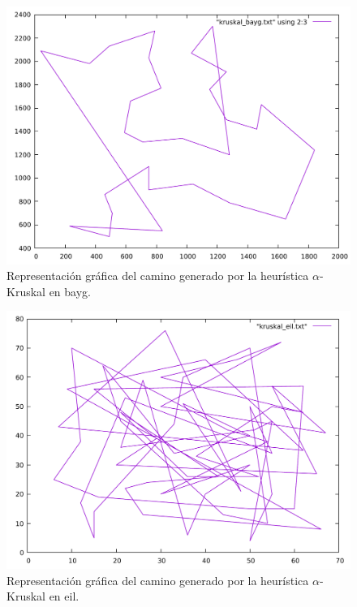 \begin{figure}[H]
  \centering
  \includegraphics[scale=0.5]{../src/kruskal_bayg.pdf}
  \caption{Representación gráfica del camino generado por la heurística $\alpha$-Kruskal en bayg.}
\end{figure} 

\begin{figure}[H]
  \centering
  \includegraphics[scale=0.5]{../src/kruskal_eil.pdf}
  \caption{Representación gráfica del camino generado por la heurística $\alpha$-Kruskal en eil.}
\end{figure} 

